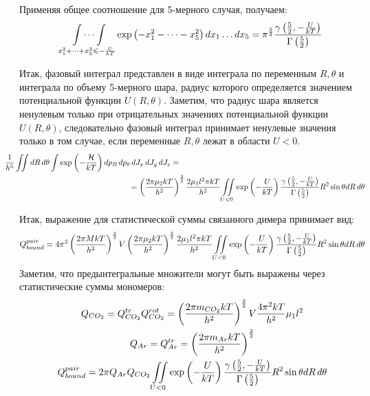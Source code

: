 Применяя общее соотношение для 5-мерного случая, получаем:
\vverh
\begin{gather}
	\idotsint\limits_{x_1^2 + \dots  + x_5^2 \leqslant -\frac{U}{k T}} \exp \left( - x_1^2 - \dots - x_5^2 \right) d x_1 \dots d x_5 = \pi^\frac{5}{2} \frac{\gamma \left( \frac{5}{2}, - \frac{U}{k T} \right)}{\Gamma \left( \frac{5}{2} \right)} \notag
\end{gather}

Итак, фазовый интеграл представлен в виде интеграла по переменным $R, \theta$ и интеграла по объему 5-мерного шара, радиус которого определяется значением потенциальной функции $U(R, \theta)$. Заметим, что радиус шара является ненулевым только при отрицательных значениях потенциальной функции $U(R, \theta)$, следовательно фазовый интеграл принимает ненулевые значения только в том случае, если переменные $R, \theta$ лежат в области $U < 0$.
\vverh
\begin{gather}
	\hspace*{-9cm} \frac{1}{h^5} \iint d R \, d \theta \int \exp \lb -\frac{\mH}{k T} \rb d p_R  \, dp_\theta \, dJ_x \, dJ_y \, dJ_z = \notag \\
	\hspace{5cm} =\lb \frac{2 \pi \mu_2 k T}{h^2} \rb^{\frac{3}{2}} \frac{2 \mu_1 l^2 \pi k T}{h^2} \iint\limits_{U < 0} \exp \lb -\frac{U}{k T} \rb \frac{\gamma \lb \frac{5}{2}, - \frac{U}{k T} \rb}{\Gamma \lb \frac{5}{2} \rb} R^2 \sin \theta dR \, d\theta \notag 
\end{gather}

Итак, выражение для статистической суммы связанного димера принимает вид:
\vverh
\begin{gather}
	Q_{bound}^{pair} = 4 \pi^2 \left( \frac{2 \pi M k T}{h^2} \right)^{\frac{3}{2}} V \left( \frac{2 \pi \mu_2 k T}{h^2} \right)^{\frac{3}{2}} \frac{2 \mu_1 l^2 \pi k T}{h^2} \iint\limits_{U < 0} \exp \left( -\frac{U}{k T} \right) \frac{\gamma \left( \frac{5}{2}, - \frac{U}{k T} \right)}{\Gamma \left( \frac{5}{2} \right)} R^2 \sin \theta dR \, d\theta \notag
\end{gather}
Заметим, что предынтегральные множители могут быть выражены через статистические суммы мономеров:
\vverh
\begin{gather}
	Q_{CO_2} = Q_{CO_2}^{tr} Q_{CO_2}^{rot} = \left( \frac{2 \pi m_{CO_2} k T}{h^2} \right)^{\frac{3}{2}} V \frac{4 \pi^2 k T}{h^2} \mu_1 l^2 \notag \\
	Q_{Ar} = Q_{Ar}^{tr} = \left( \frac{2 \pi m_{Ar} k T}{h^2} \right)^{\frac{3}{2}} \notag \\
	Q_{bound}^{pair} = 2 \pi Q_{Ar} Q_{CO_2} \iint\limits_{U < 0} \exp \left( - \frac{U}{kT} \right) \frac{\gamma \left( \frac{5}{2}, - \frac{U}{k T} \right)}{\Gamma \left( \frac{5}{2} \right)} R^2 \sin \theta d R \, d \theta \notag
\end{gather}

